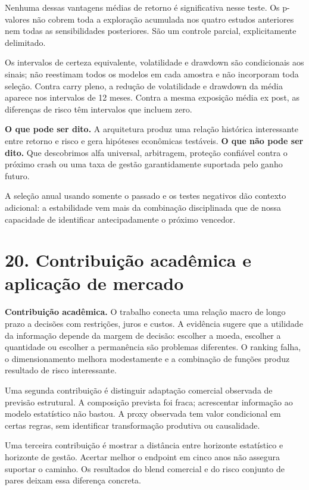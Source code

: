\documentclass[11pt,a4paper]{article}
\begin{document}
Nenhuma dessas vantagens médias de retorno é significativa nesse teste. Os p-valores não cobrem toda a exploração acumulada nos quatro estudos anteriores nem todas as sensibilidades posteriores. São um controle parcial, explicitamente delimitado.

Os intervalos de certeza equivalente, volatilidade e drawdown são condicionais aos sinais; não reestimam todos os modelos em cada amostra e não incorporam toda seleção. Contra carry pleno, a redução de volatilidade e drawdown da média aparece nos intervalos de 12 meses. Contra a mesma exposição média ex post, as diferenças de risco têm intervalos que incluem zero.

\textbf{O que pode ser dito.} A arquitetura produz uma relação histórica interessante entre retorno e risco e gera hipóteses econômicas testáveis. \textbf{O que não pode ser dito.} Que descobrimos alfa universal, arbitragem, proteção confiável contra o próximo crash ou uma taxa de gestão garantidamente suportada pelo ganho futuro.

A seleção anual usando somente o passado e os testes negativos dão contexto adicional: a estabilidade vem mais da combinação disciplinada que de nossa capacidade de identificar antecipadamente o próximo vencedor.

\clearpage
\section*{20. Contribuição acadêmica e aplicação de mercado}

\textbf{Contribuição acadêmica.} O trabalho conecta uma relação macro de longo prazo a decisões com restrições, juros e custos. A evidência sugere que a utilidade da informação depende da margem de decisão: escolher a moeda, escolher a quantidade ou escolher a permanência são problemas diferentes. O ranking falha, o dimensionamento melhora modestamente e a combinação de funções produz resultado de risco interessante.

Uma segunda contribuição é distinguir adaptação comercial observada de previsão estrutural. A composição prevista foi fraca; acrescentar informação ao modelo estatístico não bastou. A proxy observada tem valor condicional em certas regras, sem identificar transformação produtiva ou causalidade.

Uma terceira contribuição é mostrar a distância entre horizonte estatístico e horizonte de gestão. Acertar melhor o endpoint em cinco anos não assegura suportar o caminho. Os resultados do blend comercial e do risco conjunto de pares deixam essa diferença concreta.
\end{document}
